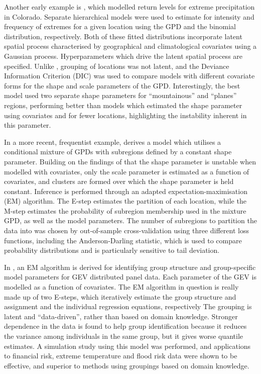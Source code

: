 \documentclass{article}
\numberwithin{equation}{section}
\begin{document}
Another early example is \citet{Cooley2007}, which modelled return levels for extreme precipitation in Colorado.
Separate hierarchical models were used to estimate for intensity and frequency of extremes for a given location using the GPD and the binomial distribution, respectively.
Both of these fitted distributions incorporate latent spatial process characterised by geographical and climatological covariates using a Gaussian process. 
Hyperparameters which drive the latent spatial process are specified.
Unlike \citet{Bottolo2003}, grouping of locations was not latent, and the Deviance Information Criterion (DIC) was used to compare models with different covariate forms for the shape and scale parameters of the GPD.
Interestingly, the best model used two separate shape parameters for ``mountainous'' and ``planes'' regions, performing better than models which estimated the shape parameter using covariates and for fewer locations, highlighting the instability inherent in this parameter.

In a more recent, frequentist example, \citet{Carreau2017} derives a model which utilises a conditional mixture of GPDs with subregions defined by a constant shape parameter.
Building on the findings of \citet{Cooley2007} that the shape parameter is unstable when modelled with covariates, only the scale parameter is estimated as a function of covariates, and clusters are formed over which the shape parameter is held constant. 
Inference is performed through an adapted expectation-maximisation (EM) algorithm. 
The E-step estimates the partition of each location, while the M-step estimates the probability of subregion membership used in the mixture GPD, as well as the model parameters.
The number of subregions to partition the data into was chosen by out-of-sample cross-validation using three different loss functions, including the Anderson-Darling statistic, which is used to compare probability distributions and is particularly sensitive to tail deviation.

In \citet{Dupuis2023}, an EM algorithm is derived for identifying group structure and group-specific model parameters for GEV distributed panel data.
Each parameter of the GEV is modelled as a function of covariates. 
The EM algorithm in question is really made up of two E-steps, which iteratively estimate the group structure and assignment and the individual regression equations, respectively
The grouping is latent and ``data-driven'', rather than based on domain knowledge. 
Stronger dependence in the data is found to help group identification because it reduces the variance among individuals in the same group, but it gives worse quantile estimates. 
A simulation study using this model was performed, and applications to financial risk, extreme temperature and flood risk data were shown to be effective, and superior to methods using groupings based on domain knowledge.
\end{document}
